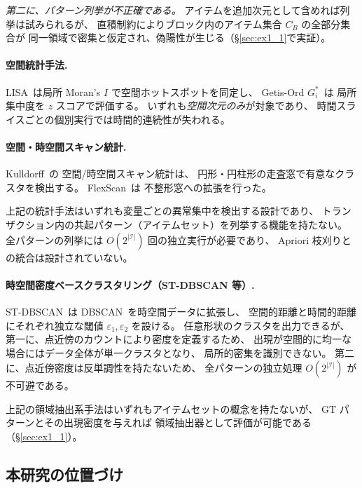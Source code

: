 \emph{第二に、パターン列挙が不正確である。}
アイテムを追加次元として含めれば列挙は試みられるが、
直積制約によりブロック内のアイテム集合 $C_B$ の全部分集合が
同一領域で密集と仮定され、偽陽性が生じる（\S\ref{sec:ex1_1}で実証）。

\paragraph{空間統計手法.}
LISA~\cite{anselin1995lisa}は局所 Moran's $I$ で空間ホットスポットを同定し、
Getis-Ord $G_i^*$~\cite{ord1995getis}は
局所集中度を $z$ スコアで評価する。
いずれも\emph{空間次元のみ}が対象であり、
時間スライスごとの個別実行では時間的連続性が失われる。

\paragraph{空間・時空間スキャン統計.}
Kulldorff~\cite{kulldorff1997spatial,kulldorff2001prospective}の
空間/時空間スキャン統計は、
円形・円柱形の走査窓で有意なクラスタを検出する。
FlexScan~\cite{tango2005flexscan}は
不整形窓への拡張を行った。

上記の統計手法はいずれも変量ごとの異常集中を検出する設計であり、
トランザクション内の共起パターン（アイテムセット）を列挙する機能を持たない。
全パターンの列挙には $O(2^{|\mathcal{I}|})$ 回の独立実行が必要であり、
Apriori 枝刈りとの統合は設計されていない。

\paragraph{時空間密度ベースクラスタリング（ST-DBSCAN 等）.}
ST-DBSCAN~\cite{birant2007stdbscan}は
DBSCAN~\cite{ester1996dbscan}を時空間データに拡張し、
空間的距離と時間的距離にそれぞれ独立な閾値
$\varepsilon_1, \varepsilon_2$ を設ける。
任意形状のクラスタを出力できるが、
第一に、点近傍のカウントにより密度を定義するため、
出現が空間的に均一な場合にはデータ全体が単一クラスタとなり、
局所的密集を識別できない。
第二に、点近傍密度は反単調性を持たないため、
全パターンの独立処理 $O(2^{|\mathcal{I}|})$ が不可避である。

上記の領域抽出系手法はいずれもアイテムセットの概念を持たないが、
GT パターンとその出現密度を与えれば
領域抽出器として評価が可能である（\S\ref{sec:ex1_1}）。

\subsection{本研究の位置づけ}

